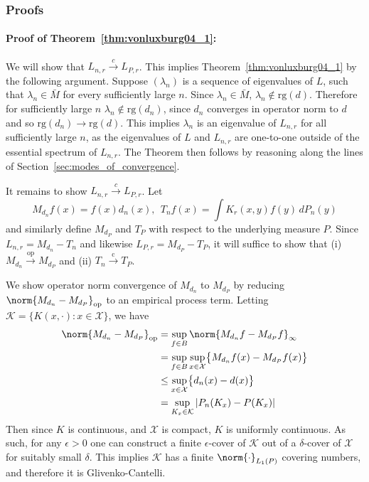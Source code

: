 \documentclass{article}
\newcommand{\abs}[1]{\left \lvert #1 \right \rvert}
\newcommand{\1}{\mathbf{1}}
\newcommand{\Xset}{\mathcal{X}}
\newcommand{\rg}{\mathrm{rg}}
\theoremstyle{alden}
\theoremstyle{aldenthm}
\theoremstyle{definition}
\theoremstyle{remark}
\begin{document}
\subsubsection{Proofs}

\paragraph{Proof of Theorem~\ref{thm:vonluxburg04_1}:}

We will show that $L_{n,r} \overset{c}{\to} L_{P,r}$. This implies Theorem~\ref{thm:vonluxburg04_1} by the following argument. Suppose $(\lambda_n)$ is a sequence of eigenvalues of $L$, such that $\lambda_n \in \bar{M}$ for every sufficiently large $n$. Since $\lambda_n \in \bar{M}$, $\lambda_n \not\in \rg(d)$. Therefore for sufficiently large $n$ $\lambda_n \not\in \rg(d_n)$, since $d_n$ converges in operator norm to $d$ and so $\rg(d_n) \to \rg(d)$. This implies $\lambda_n$ is an eigenvalue of $L_{n,r}$ for all sufficiently large $n$, as the eigenvalues of $L$ and $L_{n,r}$ are one-to-one outside of the essential spectrum of $L_{n,r}$. The Theorem then follows by reasoning along the lines of Section~\ref{sec:modes_of_convergence}.

It remains to show $L_{n,r} \overset{c}{\to} L_{P,r}$. Let 
\begin{equation*}
M_{d_n}f(x) = f(x) d_n(x),~~T_nf(x) = \int K_r(x,y) f(y) \,dP_n(y)
\end{equation*}
and similarly define $M_{d_P}$ and $T_P$ with respect to the underlying measure $P$. Since $L_{n,r} = M_{d_n} - T_n$ and likewise $L_{P,r} = M_{d_P}- T_{P}$, it will suffice to show that (i) $M_{d_n} \overset{\mathrm{op}}{\to} M_{d_P}$ and (ii) $T_n \overset{\mathrm{c}}{\to} T_P$. 

We show operator norm convergence of $M_{d_n}$ to $M_{d_P}$ by reducing $\norm{M_{d_n} - M_{d_P}}_{\mathrm{op}}$ to an empirical process term. Letting $\mathcal{K} = \{K(x,\cdot): x \in \Xset\}$, we have
\begin{align}
\norm{M_{d_n} - M_{d_P}}_{\mathrm{op}} & = \sup_{f \in B} \norm{M_{d_n}f - M_{d_P}f}_{\infty} \\
& = \sup_{f \in B} \sup_{x \in \Xset}\bigl\{M_{d_n}f(x) - M_{d_P}f(x)\bigr\} \\
& \leq \sup_{x \in \Xset}\bigl\{d_n(x) - d(x)\bigr\} \\
& = \sup_{K_x \in \mathcal{K}} \abs{P_n(K_x) - P(K_x)} 
\end{align}
Then since $K$ is continuous, and $\Xset$ is compact, $K$ is uniformly continuous. As such, for any $\epsilon > 0$ one can construct a finite $\epsilon$-cover of $\mathcal{K}$ out of a $\delta$-cover of $\Xset$ for suitably small $\delta$. This implies $\mathcal{K}$ has a finite $\norm{\cdot}_{L_1(P)}$ covering numbers, and therefore it is Glivenko-Cantelli.
\end{document}
